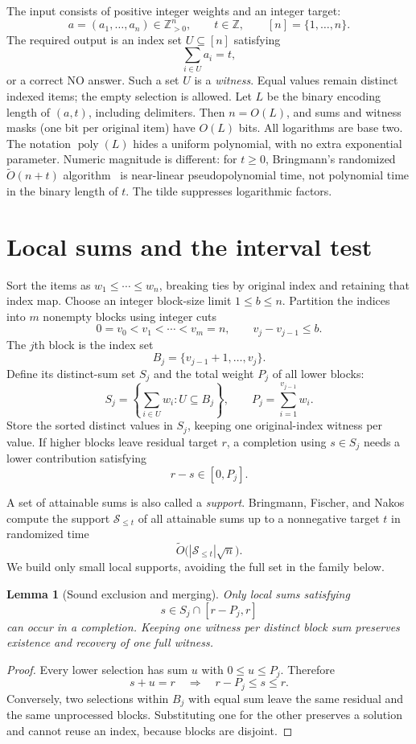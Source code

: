 \documentclass[10pt]{article}
\newtheorem{lemma}[theorem]{Lemma}
\newcommand{\poly}{\operatorname{poly}}
\begin{document}
The input consists of positive integer weights and an integer target:
\[
 a=(a_1,\ldots,a_n)\in\mathbb Z_{>0}^n,
 \qquad t\in\mathbb Z,\qquad [n]=\{1,\ldots,n\}.
\]
The required output is an index set $U\subseteq[n]$ satisfying
\[
 \sum_{i\in U}a_i=t,
\]
or a correct NO answer. Such a set $U$ is a
\emph{witness}.
Equal values remain distinct indexed items; the empty selection is allowed.
Let $L$ be the binary encoding length of $(a,t)$, including delimiters.
Then $n=O(L)$, and sums and witness masks (one bit per original item)
have $O(L)$ bits. All logarithms are base two.
The notation $\poly(L)$ hides a uniform polynomial, with no extra
exponential parameter. Numeric magnitude is different: for $t\ge0$, Bringmann's randomized
$\widetilde O(n+t)$ algorithm~\cite{pseudo} is near-linear
pseudopolynomial time, not polynomial time in the binary length of $t$.
The tilde suppresses logarithmic factors.

\section{Local sums and the interval test}
Sort the items as $w_1\le\cdots\le w_n$, breaking ties by original index and
retaining that index map. Choose an integer block-size limit $1\le b\le n$.
Partition the indices into $m$ nonempty blocks using integer cuts
\[
 0=v_0<v_1<\cdots<v_m=n,\qquad v_j-v_{j-1}\le b.
\]
The $j$th block is the index set
\[
 B_j=\{v_{j-1}+1,\ldots,v_j\}.
\]
Define its distinct-sum set $S_j$ and the total weight $P_j$ of all lower blocks:
\begin{equation}\label{eq:local}
 S_j=\left\{\sum_{i\in U}w_i:U\subseteq B_j\right\},
 \qquad P_j=\sum_{i=1}^{v_{j-1}}w_i.
\end{equation}
Store the sorted distinct values in $S_j$, keeping one original-index witness
per value. If higher blocks leave residual target $r$, a completion using
$s\in S_j$ needs a lower contribution satisfying
\[
 r-s\in[0,P_j].
\]

A set of attainable sums is also called a \emph{support}. Bringmann,
Fischer, and Nakos~\cite{support} compute the support $\mathcal S_{\le t}$
of all attainable sums up to a nonnegative target $t$ in randomized time
\[
 \widetilde O\bigl(|\mathcal S_{\le t}|\sqrt n\bigr).
\]
We build only small local
supports, avoiding the full set in the family below.

\begin{lemma}[Sound exclusion and merging]\label{lem:exact}
Only local sums satisfying
\[
 s\in S_j\cap[r-P_j,r]
\]
can occur in a completion.
Keeping one witness per distinct block sum preserves existence and recovery
of one full witness.
\end{lemma}
\begin{proof}
Every lower selection has sum $u$ with $0\le u\le P_j$. Therefore
\[
 s+u=r\quad\Longrightarrow\quad r-P_j\le s\le r.
\]
Conversely, two selections within $B_j$ with equal sum
leave the same residual and the same unprocessed blocks. Substituting one
for the other preserves a solution and cannot reuse an index, because
blocks are disjoint.
\end{proof}
\end{document}
